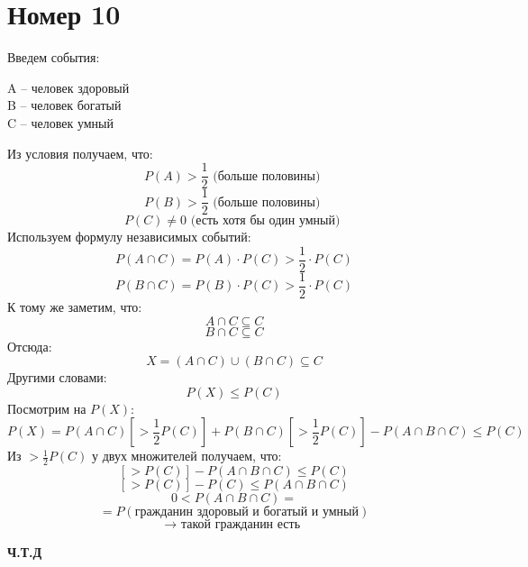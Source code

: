 \documentclass[a4paper,12pt]{article}
\begin{document}
\section*{Номер 10}
Введем события:
\begin{center}
A -- человек здоровый \\
B -- человек богатый \\
C -- человек умный
\end{center}
Из условия получаем, что:
\[
P(A) > \frac12 \text{ (больше половины) }
\]
\[
P(B) > \frac12 \text{ (больше половины) }
\]
\[
P(C) \neq 0 \text{ (есть хотя бы один умный) } 
\]
Используем формулу независимых событий:
\[
P(A \cap C) = P(A) \cdot P(C) > \frac{1}{2} \cdot P(C)
\]
\[
P(B \cap C) = P(B) \cdot P(C) > \frac{1}{2} \cdot P(C)
\]
К тому же заметим, что:
\[
A \cap C \subseteq C
\]
\[
B \cap C \subseteq C
\]
Отсюда:
\[
X = (A \cap C) \cup (B \cap C)  \subseteq C
\]
Другими словами:
\[
P(X) \leq P(C) 
\]
Посмотрим на $P(X)$:
\[
P(X) = P(A \cap C) \left[> \frac12 P(C)\right]+ P(B \cap C)\left[> \frac12 P(C)\right] - P(A \cap B \cap C) \leq P(C)
\]
Из $> \frac12 P(C)$ у двух множителей получаем, что:
\[
\left[ > P(C)\right] - P(A \cap B \cap C) \leq P(C)
\]
\[
\left[ > P(C)\right] - P(C) \leq P(A \cap B \cap C)
\]
\[
0 < P(A \cap B \cap C) =
\] 
\[
=
P( \text{гражданин здоровый и богатый и умный})
 \]
\[
\rightarrow \text{ такой гражданин есть }
\]
\begin{center}
\textbf{Ч.Т.Д} 
\end{center}
\end{document}
